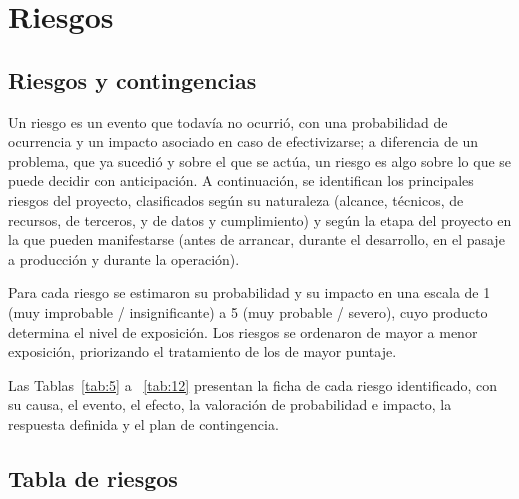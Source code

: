 \chapter{Riesgos}\label{cap:riesgos}

\section{Riesgos y contingencias}

Un riesgo es un evento que todavía no ocurrió, con una probabilidad de ocurrencia y un impacto asociado en caso de efectivizarse; a diferencia de un problema, que ya sucedió y sobre el que se actúa, un riesgo es algo sobre lo que se puede decidir con anticipación. A continuación, se identifican los principales riesgos del proyecto, clasificados según su naturaleza (alcance, técnicos, de recursos, de terceros, y de datos y cumplimiento) y según la etapa del proyecto en la que pueden manifestarse (antes de arrancar, durante el desarrollo, en el pasaje a producción y durante la operación).

Para cada riesgo se estimaron su probabilidad y su impacto en una escala de 1 (muy improbable / insignificante) a 5 (muy probable / severo), cuyo producto determina el nivel de exposición. Los riesgos se ordenaron de mayor a menor exposición, priorizando el tratamiento de los de mayor puntaje.

Las Tablas~\ref{tab:5} a ~\ref{tab:12} presentan la ficha de cada riesgo identificado, con su causa, el evento, el efecto, la valoración de probabilidad e impacto, la respuesta definida y el plan de contingencia.

\section{Tabla de riesgos}

